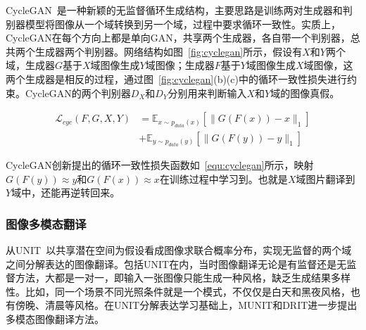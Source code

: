 CycleGAN~\cite{zhu2017unpaired}是一种新颖的无监督循环生成结构，主要思路是训练两对生成器和判别器模型将图像从一个域转换到另一个域，过程中要求循环一致性。实质上，CycleGAN在每个方向上都是单向GAN，共享两个生成器，各自带一个判别器，总共两个生成器两个判别器。网络结构如图~\ref{fig:cyclegan}所示，假设有$X$和$Y$两个域，生成器$G$基于$X$域图像生成$Y$域图像；生成器$F$基于$Y$域图像生成$X$域图像，这两个生成器是相反的过程，通过图~\ref{fig:cyclegan}(b)(c)中的循环一致性损失进行约束。CycleGAN的两个判别器$D_X$和$D_Y$分别用来判断输入$X$和$Y$域的图像真假。%

\begin{equation}
\label{equ:cyclegan}
\begin{aligned}
\mathcal{L}_{cyc}(F,G,X,Y) & = \mathbb{E}_{x \sim p_{data}(x)}[\parallel G(F(x))-x \parallel_1]\\
& + \mathbb{E}_{y \sim p_{data}(y)}[\parallel G(F(y))-y \parallel_1]
\end{aligned}
\end{equation}

CycleGAN创新提出的循环一致性损失函数如~\ref{equ:cyclegan}所示，映射$ G(F(y)) \approx y$和$ G(F(x)) \approx x$在训练过程中学习到。也就是$X$域图片翻译到$Y$域中，还能再逆转回来。%



\subsubsection{图像多模态翻译}
从UNIT~\cite{liu2017unsupervised}以共享潜在空间为假设看成图像求联合概率分布，实现无监督的两个域之间分解表达的图像翻译。包括UNIT在内，当时图像翻译无论是有监督还是无监督方法，大都是一对一，即输入一张图像只能生成一种风格，缺乏生成结果多样性。比如，同一个场景不同光照条件就是一个模式，不仅仅是白天和黑夜风格，也有傍晚、清晨等风格。在UNIT分解表达学习基础上，MUNIT和DRIT进一步提出多模态图像翻译方法。

